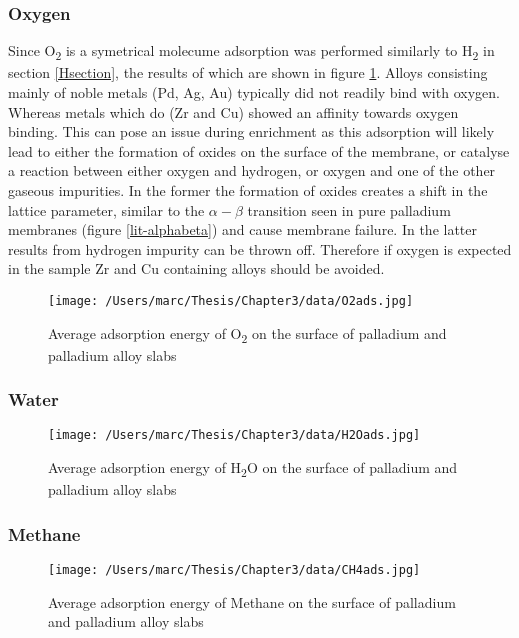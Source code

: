 \subsubsection{Oxygen}
Since O\textsubscript{2} is a symetrical molecume adsorption was performed similarly to H\textsubscript{2} in section \ref{Hsection}, the results of which are shown in figure \ref{O2ads}. Alloys consisting mainly of noble metals (Pd, Ag, Au) typically did not readily bind with oxygen. Whereas metals which do (Zr and Cu) showed an affinity towards oxygen binding. This can pose an issue during enrichment as this adsorption will likely lead to either the formation of oxides on the surface of the membrane, or catalyse a reaction between either oxygen and hydrogen, or oxygen and one of the other gaseous impurities. In the former the formation of oxides creates a shift in the lattice parameter, similar to the $\alpha - \beta$ transition seen in pure palladium membranes (figure \ref{lit-alphabeta})\cite{Li2008b} and cause membrane failure. In the latter results from hydrogen impurity can be thrown off. Therefore if oxygen is expected in the sample Zr and Cu containing alloys should be avoided.
\begin{landscape}
  \begin{figure}
      \centering
      \texttt{[image: /Users/marc/Thesis/Chapter3/data/O2ads.jpg]}
      \caption{Average adsorption energy of O\textsubscript{2} on the surface of palladium and palladium alloy slabs}
      \label{O2ads}
    \end{figure}
  
  \end{landscape}

\subsubsection{Water}

\begin{landscape}
  \begin{figure}
      \centering
      \texttt{[image: /Users/marc/Thesis/Chapter3/data/H2Oads.jpg]}
      \caption{Average adsorption energy of H\textsubscript{2}O on the surface of palladium and palladium alloy slabs}
      \label{H2Oads}
    \end{figure}
  
  \end{landscape}
\subsubsection{Methane}
\begin{landscape}
  \begin{figure}
      \centering
      \texttt{[image: /Users/marc/Thesis/Chapter3/data/CH4ads.jpg]}
      \caption{Average adsorption energy of Methane on the surface of palladium and palladium alloy slabs}
      \label{CH4ads}
    \end{figure}
  
  \end{landscape}
